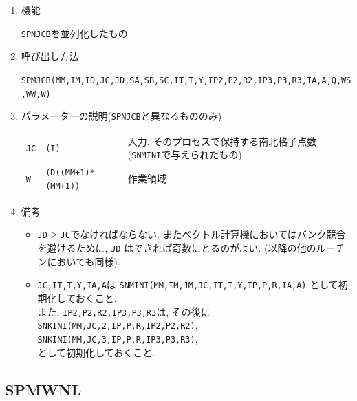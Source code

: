 \begin{enumerate}

\item 機能

 {\tt SPNJCB}を並列化したもの

\item 呼び出し方法

{\tt SPMJCB(MM,IM,ID,JC,JD,SA,SB,SC,IT,T,Y,IP2,P2,R2,IP3,P3,R3,IA,A,Q,WS,WW,W)}
  
\item パラメーターの説明({\tt SPNJCB}と異なるもののみ)

\begin{tabular}{lll}
{\tt JC} & {\tt (I)} & 入力. そのプロセスで保持する南北格子点数
                        ({\tt SNMINI}で与えられたもの)\\
{\tt W}  & {\tt (D((MM+1)*(MM+1))} & 作業領域
\end{tabular}

\item 備考

\begin{itemize}

\item {\tt JD}$\ge${\tt JC}でなければならない.
   またベクトル計算機においてはバンク競合を避けるために, {\tt JD}
   はできれば奇数にとるのがよい. (以降の他のルーチンにおいても同様).

\item {\tt JC,IT,T,Y,IA,A}は 
      {\tt SNMINI(MM,IM,JM,JC,IT,T,Y,IP,P,R,IA,A)} として初期化しておくこと.\\
       また, {\tt IP2,P2,R2,IP3,P3,R3}は, その後に\\
      {\tt SNKINI(MM,JC,2,IP,P,R,IP2,P2,R2)},
      {\tt SNKINI(MM,JC,3,IP,P,R,IP3,P3,R3)}, \\
      として初期化しておくこと.

 \end{itemize}

\end{enumerate}


\subsection{SPMWNL}

